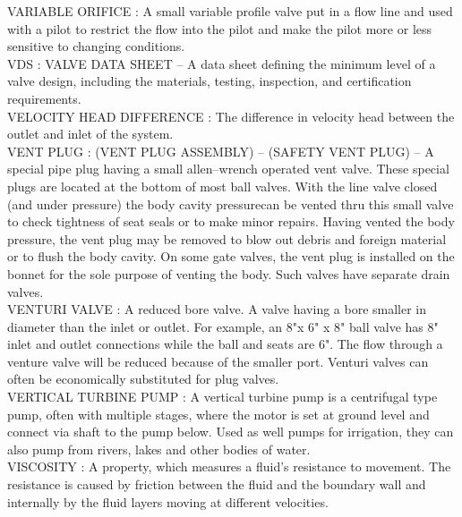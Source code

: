 \vspace{0.15cm}
VARIABLE ORIFICE :   A small variable profile valve put in a flow line and used with a pilot to restrict the flow into the pilot and make the pilot more or less sensitive to changing conditions.\\
\vspace{0.15cm}
VDS :  VALVE DATA SHEET –  A data sheet defining the minimum level of a valve design, including the materials, testing, inspection, and certification requirements.\\
\vspace{0.15cm}
VELOCITY HEAD DIFFERENCE :   The difference in velocity head between the outlet and inlet of the system.\\
\vspace{0.15cm}
VENT PLUG :  (VENT PLUG ASSEMBLY) – (SAFETY VENT PLUG) –  A special pipe plug having a small allen–wrench operated vent valve. These special plugs are located at the bottom of most ball valves. With the line valve closed (and under pressure) the body cavity pressurecan be vented thru this small valve to check tightness of seat seals or to make minor repairs. Having vented the body pressure, the vent plug may be removed to blow out debris and foreign material or to flush the body cavity. On some gate valves, the vent plug is installed on the bonnet for the sole purpose of venting the body. Such valves have separate drain valves.\\
\vspace{0.15cm}
VENTURI VALVE :   A reduced bore valve. A valve having a bore smaller in diameter than the inlet or outlet. For example, an 8"x 6" x 8" ball valve has 8" inlet and outlet connections while the ball and seats are 6". The flow through a venture valve will be reduced because of the smaller port. Venturi valves can often be economically substituted for plug valves.\\
\vspace{0.15cm}
VERTICAL TURBINE PUMP :   A vertical turbine pump is a centrifugal type pump, often with multiple stages, where the motor is set at ground level and connect via shaft to the pump below. Used as well pumps for irrigation, they can also pump from rivers, lakes and other bodies of water.\\
\vspace{0.15cm}
VISCOSITY :   A property, which measures a fluid’s resistance to movement. The resistance is caused by friction between the fluid and the boundary wall and internally by the fluid layers moving at different velocities.\\
